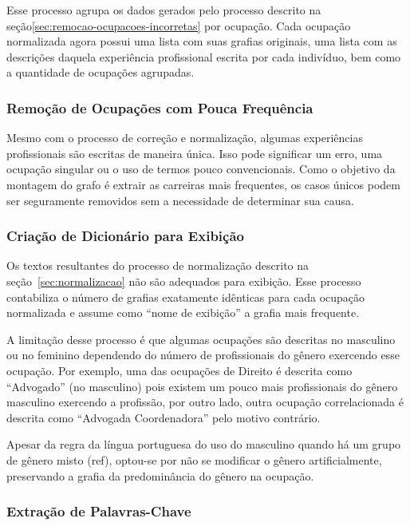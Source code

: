 \documentclass[12pt,a4paper,final]{article}
\begin{document}
Esse processo agrupa os dados gerados pelo processo descrito na seção\ref{sec:remocao-ocupacoes-incorretas} por ocupação. Cada ocupação normalizada agora possui uma lista com suas grafias originais, uma lista com as descrições daquela experiência profissional escrita por cada indivíduo, bem como a quantidade de ocupações agrupadas.

\subsubsection{Remoção de Ocupações com Pouca Frequência}

Mesmo com o processo de correção e normalização, algumas experiências profissionais são escritas de maneira única. Isso pode significar um erro, uma ocupação singular ou o uso de termos pouco convencionais. Como o objetivo da montagem do grafo é extrair as carreiras mais frequentes, os casos únicos podem ser seguramente removidos sem a necessidade de determinar sua causa.

\subsubsection{Criação de Dicionário para Exibição} \label{sec:criar-dicionario}

Os textos resultantes do processo de normalização descrito na seção~\ref{sec:normalizacao} não são adequados para exibição. Esse processo contabiliza o número de grafias exatamente idênticas para cada ocupação normalizada e assume como \enquote{nome de exibição} a grafia mais frequente.

A limitação desse processo é que algumas ocupações são descritas no masculino ou no feminino dependendo do número de profissionais do gênero exercendo esse ocupação. Por exemplo, uma das ocupações de Direito é descrita como \enquote{Advogado} (no masculino) pois existem um pouco mais profissionais do gênero masculino exercendo a profissão, por outro lado, outra ocupação correlacionada é descrita como \enquote{Advogada Coordenadora} pelo motivo contrário.

Apesar da regra da língua portuguesa do uso do masculino quando há um grupo de gênero misto (ref), optou-se por não se modificar o gênero artificialmente, preservando a grafia da predominância do gênero na ocupação.

\subsubsection{Extração de Palavras-Chave}
\end{document}
